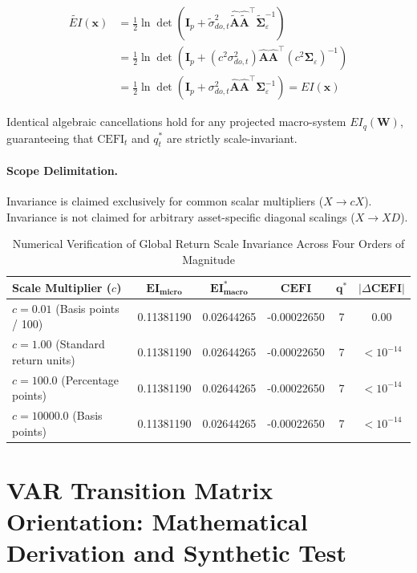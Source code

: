 \documentclass[12pt]{article}
\begin{document}
\begin{enumerate}
    \begin{align}
    \widetilde{EI}(\mathbf{x}) &= \frac{1}{2} \ln \det \left( \mathbf{I}_p + \tilde{\sigma}_{do,t}^2 \hat{\tilde{\mathbf{A}}}\hat{\tilde{\mathbf{A}}}^\top \tilde{\boldsymbol{\Sigma}}_\varepsilon^{-1} \right) \nonumber \\
    &= \frac{1}{2} \ln \det \left( \mathbf{I}_p + (c^2 \sigma_{do,t}^2) \hat{\mathbf{A}}\hat{\mathbf{A}}^\top (c^2 \boldsymbol{\Sigma}_\varepsilon)^{-1} \right) \nonumber \\
    &= \frac{1}{2} \ln \det \left( \mathbf{I}_p + \sigma_{do,t}^2 \hat{\mathbf{A}}\hat{\mathbf{A}}^\top \boldsymbol{\Sigma}_\varepsilon^{-1} \right) = EI(\mathbf{x})
    \end{align}
\end{enumerate}
Identical algebraic cancellations hold for any projected macro-system $EI_q(\mathbf{W})$, guaranteeing that $\mathrm{CEFI}_t$ and $q_t^*$ are strictly scale-invariant.

\paragraph{Scope Delimitation.} Invariance is claimed exclusively for common scalar multipliers ($X \to c X$). Invariance is not claimed for arbitrary asset-specific diagonal scalings ($X \to X D$).

\begin{table}[htbp]
\centering
\caption{Numerical Verification of Global Return Scale Invariance Across Four Orders of Magnitude}
\label{tab:app_scale_inv}
\begin{tabular}{lccccc}
\toprule
\textbf{Scale Multiplier ($c$)} & $\mathbf{EI_{\text{micro}}}$ & $\mathbf{EI_{\text{macro}}^*}$ & $\mathbf{CEFI}$ & $\mathbf{q^*}$ & $|\Delta \mathbf{CEFI}|$ \\
\midrule
$c = 0.01$ (Basis points / 100) & 0.11381190 & 0.02644265 & -0.00022650 & 7 & $0.00$ \\
$c = 1.00$ (Standard return units) & 0.11381190 & 0.02644265 & -0.00022650 & 7 & $< 10^{-14}$ \\
$c = 100.0$ (Percentage points)   & 0.11381190 & 0.02644265 & -0.00022650 & 7 & $< 10^{-14}$ \\
$c = 10000.0$ (Basis points)      & 0.11381190 & 0.02644265 & -0.00022650 & 7 & $< 10^{-14}$ \\
\bottomrule
\end{tabular}
\end{table}

\section{VAR Transition Matrix Orientation: Mathematical Derivation and Synthetic Test}
\label{app:var_orientation}
\end{document}
